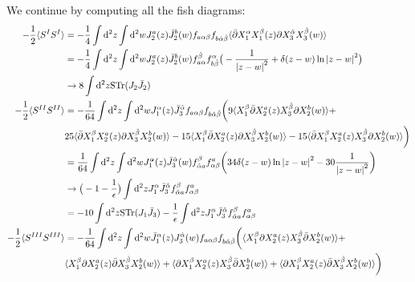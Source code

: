 \documentclass[12pt]{article}
\numberwithin{equation}{section}
\newcommand{\h}[1]{\hat{#1}}
\begin{document}
We continue by computing all the fish diagrams:
{\allowdisplaybreaks
\begin{align}
	-\frac{1}{2}\langle S^I S^I \rangle &= -\frac{1}{4} \int \dd^2z \int \dd^2 w J_2^a(z) \bar{J}_2^b(w) f_{a\alpha \beta} f_{b\h{\alpha}\h{\beta}} \langle \bar{\partial} X_1^\alpha X_1^\beta(z) \partial X_3^{\h{\alpha}} X_3^{\h{\beta}}(w)\rangle \nonumber \\
					    &= -\frac{1}{4} \int \dd^2 z \int \dd^2 w J_2^a(z) \bar{J}_2^b(w) f^{\h{\beta}}_{a \alpha} f^\alpha_{b\h{\beta}}\big(-\frac{1}{\abs{z-w}^2} + \delta(z-w) \ln\abs{z-w}^2\big) \nonumber \\
					    &\to 8 \int \dd^2z \text{STr} (J_2 \bar{J}_2) \nonumber \\
-\frac{1}{2} \langle S^{II} S^{II} \rangle &= 	-\frac{1}{64}\int \dd^2 z \int \dd^2 w J_1^\alpha(z) \bar{J}_3^{\h{\alpha}} f_{a \alpha \beta} f_{b \h{\alpha} \h{\beta}} \biggr(9 \langle X_1^\beta \bar{\partial} X_2^a(z) X_3^{\h{\beta}} \partial X_2^b(w) \rangle + \nonumber \\
					   &25 \langle \bar{\partial} X_1^\beta X_2^a(z) \partial X_3^{\h{\beta}} X_2^b(w)\rangle -
					     15 \langle X_1^\beta \bar{\partial} X_2^a(z) \partial X_3^{\h{\beta}} X_2^b(w)\rangle - 15 \langle \bar{\partial} X_1^\beta X_2^a(z) X_3^{\h{\beta}} \partial X_2^b(w)\rangle \biggr)					  \nonumber \\
					   &=\frac{1}{64} \int \dd^2 z \int \dd^2 w J_1^\alpha(z) \bar{J}_3^{\h{\alpha}}(w) f^\beta_{\h{\alpha} a } f^a_{\alpha \beta} \biggr(34 \delta(z-w)\ln\abs{z-w}^2 - 30 \frac{1}{\abs{z-w}^2}\biggr) \nonumber \\
					   &\to\big(-1 - \frac{1}{\epsilon}\big)\int \dd^2 z J_1^\alpha \bar{J}_3^{\h{\alpha}} f_{\h{\alpha}a}^\beta f^a_{\alpha \beta} \nonumber \\
					   &= -10 \int \dd^2z \text{STr}(J_1 \bar{J}_3) - \frac{1}{\epsilon} \int \dd^2 z  J_1^\alpha \bar{J}_3^{\h{\alpha}} f_{\h{\alpha}a}^\beta f^a_{\alpha \beta} \nonumber \\
-\frac{1}{2}\langle S^{III} S^{III} \rangle &= -\frac{1}{64} \int \dd^2z \int \dd^2 w \bar{J}_1^\alpha(z) J_3^{\h{\alpha}}(w) f_{a \alpha \beta} f_{b \h{\alpha}\h{\beta}} \biggr(\langle X_1^\beta \partial X_2^a(z) X_3^{\h{\beta}} \bar{\partial} X_2^b(w)\rangle +\nonumber \\
					    &\langle X_1^\beta \partial X_2^a(z) \bar{\partial} X_3^{\h{\beta}} X_2^b(w)\rangle + \langle \partial X_1^\beta X_2^a(z) X_3^{\h{\beta}} \bar{\partial} X_2^b(w)\rangle + \langle \partial X_1^\beta X_2^a(z) \bar{\partial}X_3^{\h{\beta}} X_2^b(w)\rangle\biggr) \nonumber \\

\end{align}}
\end{document}
